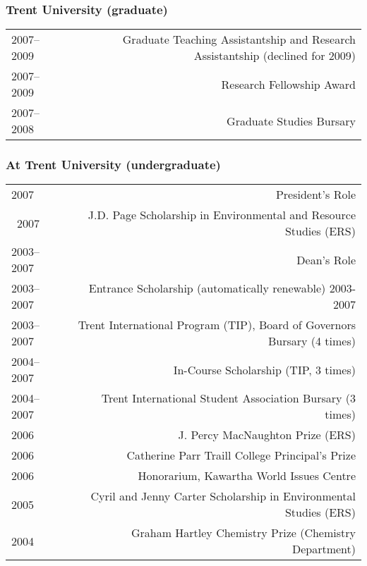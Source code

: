 \subsubsection*{Trent University (graduate)}
\begin{tabular}{L!{\VRule}R}    
2007--2009 & Graduate Teaching Assistantship and Research Assistantship (declined for 2009) \\
2007--2009 & Research Fellowship Award \\
2007--2008 & Graduate Studies Bursary \\
\end{tabular}

\subsubsection*{At Trent University (undergraduate)}
\begin{tabular}{L!{\VRule}R}    
2007 & President's Role  \\\
2007 & J.D. Page Scholarship in Environmental and Resource Studies (ERS) \\ 
2003--2007 & Dean's Role \\
2003--2007 & Entrance Scholarship (automatically renewable) 2003-2007 \\
2003--2007 & Trent International Program (TIP), Board of Governors Bursary (4 times) \\
2004--2007 & In-Course Scholarship (TIP, 3 times) \\
2004--2007 & Trent International Student Association Bursary (3 times) \\
2006 & J. Percy MacNaughton Prize (ERS) \\
2006 & Catherine Parr Traill College Principal's Prize \\
2006 & Honorarium, Kawartha World Issues Centre \\
2005 & Cyril and Jenny Carter Scholarship in Environmental Studies (ERS) \\
2004 & Graham Hartley Chemistry Prize (Chemistry Department) \\
\end{tabular}
